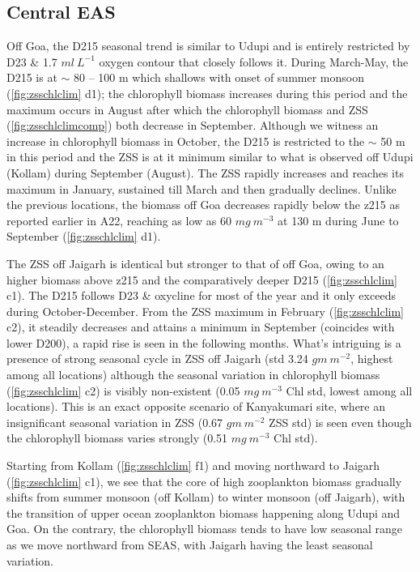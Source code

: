 \documentclass{article}
\begin{document}
	\subsection{Central EAS}
	Off Goa, the D215 seasonal trend is similar to Udupi and is entirely restricted by D23 \& 1.7 $ml \ L^{-1}$ oxygen contour that closely follows it. During March-May, the D215 is at $\sim$ 80 -- 100 m which shallows with onset of summer monsoon (\cref{fig:zsschlclim} d1); the chlorophyll biomass increases during this period and the maximum occurs in August after which the chlorophyll biomass and ZSS (\cref{fig:zsschlclimcomp}) both decrease in September. Although we witness an increase in chlorophyll biomass in October, the D215 is restricted to the $\sim$ 50 m in this period  and the ZSS is at it minimum  similar to what is observed off Udupi (Kollam) during September (August). The ZSS rapidly increases and reaches its maximum in January, sustained till March and then gradually declines. Unlike the previous locations, the biomass off Goa decreases rapidly below the z215 as reported earlier in A22, reaching as low as 60 $mg \ m^{-3}$ at 130 m during June to September (\cref{fig:zsschlclim} d1).
	 
	
	The ZSS off Jaigarh is identical but stronger to that of off Goa, owing to an higher biomass above z215 and the comparatively deeper D215 (\cref{fig:zsschlclim} c1). The D215 follows D23 \& oxycline for most of the year and it only exceeds during October-December.  From the ZSS maximum in February (\cref{fig:zsschlclim} c2), it steadily decreases and attains a minimum in September (coincides with lower D200), a rapid rise is seen in the following months. What's intriguing is a presence of strong seasonal cycle in ZSS off Jaigarh (std 3.24 $gm\ m^{-2}$, highest among all locations) although the seasonal variation in chlorophyll biomass (\cref{fig:zsschlclim} c2) is visibly non-existent (0.05 $mg\ m^{-3}$ Chl std, lowest among all locations). This is an exact opposite scenario of Kanyakumari site, where an insignificant seasonal variation in ZSS (0.67 $gm\ m^{-2}$ ZSS std) is seen even though the chlorophyll biomass varies strongly (0.51 $mg\ m^{-3}$ Chl std). 
		
	Starting from Kollam (\cref{fig:zsschlclim} f1) and moving northward to Jaigarh (\cref{fig:zsschlclim} c1), we see that the core of high zooplankton biomass gradually shifts from summer monsoon (off Kollam) to winter monsoon (off Jaigarh), with the transition of upper ocean zooplankton biomass happening along Udupi and Goa. On the contrary, the chlorophyll biomass tends to have low seasonal range as we move northward from SEAS, with Jaigarh having the least seasonal variation.
	 
\end{document}
